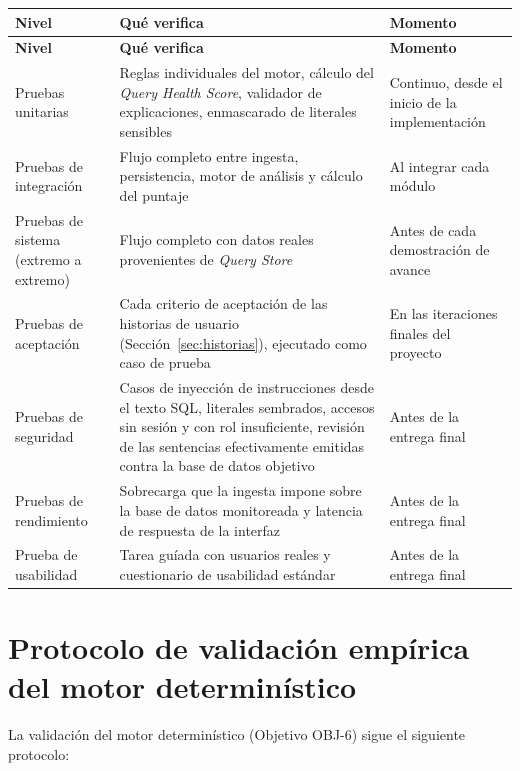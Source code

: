 \documentclass[11pt,a4paper]{report}
\begin{document}
\begin{xltabular}{\linewidth}{@{}p{2.6cm}Xp{2.6cm}@{}}
\toprule
\textbf{Nivel} & \textbf{Qu\'e verifica} & \textbf{Momento} \\
\midrule
\endfirsthead
\toprule
\textbf{Nivel} & \textbf{Qu\'e verifica} & \textbf{Momento} \\
\midrule
\endhead
\bottomrule
\endlastfoot
Pruebas unitarias & Reglas individuales del motor, c\'alculo del \textit{Query Health Score}, validador de explicaciones, enmascarado de literales sensibles & Continuo, desde el inicio de la implementaci\'on \\
Pruebas de integraci\'on & Flujo completo entre ingesta, persistencia, motor de an\'alisis y c\'alculo del puntaje & Al integrar cada m\'odulo \\
Pruebas de sistema (extremo a extremo) & Flujo completo con datos reales provenientes de \textit{Query Store} & Antes de cada demostraci\'on de avance \\
Pruebas de aceptaci\'on & Cada criterio de aceptaci\'on de las historias de usuario (Secci\'on~\ref{sec:historias}), ejecutado como caso de prueba & En las iteraciones finales del proyecto \\
Pruebas de seguridad & Casos de inyecci\'on de instrucciones desde el texto SQL, literales sembrados, accesos sin sesi\'on y con rol insuficiente, revisi\'on de las sentencias efectivamente emitidas contra la base de datos objetivo & Antes de la entrega final \\
Pruebas de rendimiento & Sobrecarga que la ingesta impone sobre la base de datos monitoreada y latencia de respuesta de la interfaz & Antes de la entrega final \\
Prueba de usabilidad & Tarea gu\'iada con usuarios reales y cuestionario de usabilidad est\'andar & Antes de la entrega final \\
\end{xltabular}

\section{Protocolo de validaci\'on emp\'irica del motor determin\'istico}
\label{sec:protocolo-motor}

La validaci\'on del motor determin\'istico (Objetivo OBJ-6) sigue el siguiente protocolo:
\end{document}
